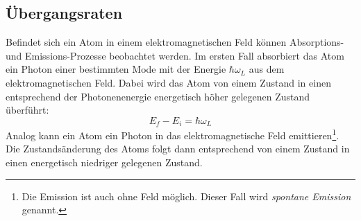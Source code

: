 \subsection{Übergangsraten}\label{subsec:uebergangsraten}
Befindet sich ein Atom in einem elektromagnetischen Feld können Absorptions- und
Emissions-Prozesse beobachtet werden. Im ersten Fall absorbiert das Atom ein
Photon einer bestimmten Mode mit der Energie $\hbar\omega_L$ aus dem elektromagnetischen Feld.
Dabei wird das Atom von einem Zustand in einen entsprechend der Photonenenergie
energetisch höher gelegenen Zustand überführt:
\begin{equation}\label{eq:uebergang}
	E_f-E_i=\hbar\omega_L
\end{equation}
Analog kann ein Atom ein
Photon in das elektromagnetische Feld emittieren\footnote{Die Emission ist
auch ohne Feld möglich. Dieser Fall wird \textit{spontane Emission} genannt.}.
Die Zustandsänderung des Atoms folgt dann entsprechend von einem Zustand in
einen energetisch niedriger gelegenen Zustand.\par

